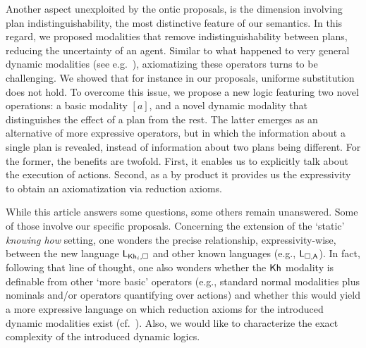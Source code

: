 Another aspect unexploited by the ontic proposals, is the dimension involving plan indistinguishability, the most distinctive feature of our semantics. In this regard, we proposed modalities that remove indistinguishability between plans, reducing the uncertainty of an agent. Similar to what happened to very general dynamic modalities (see e.g.~\cite{ArecesFH15}), axiomatizing these operators turns to be challenging. We showed that for instance in our proposals, uniforme substitution does not hold. To overcome this issue, we propose a new logic featuring two novel operations: a basic modality $[a]$, and a novel dynamic modality that distinguishes the effect of a plan from the rest. The latter emerges as an alternative of more expressive operators, but in which the information about a single plan is revealed, instead of information about two plans being different. For the former, the benefits are twofold. First, it enables us to explicitly talk about the execution of actions. Second, as a by product it provides us the expressivity to obtain an axiomatization via reduction axioms.

\begin{comment}
To the best of our knowledge, this is the first attempt to establish a theory of dynamic epistemic logics for knowing how. We argue that the semantics provided in~\cite{AFSVQ21,AFSVQ23report} is the crucial aspect for succeeding in this goal. Moreover, our work opens the path to study other dynamic operators in this context. For instance, we could define dynamic modalities based on action models, like those in~\cite{BaltagMS98,DELbook,GalimullinA22}. 
Also, it would be interesting to explore alternative techniques for obtaining proof systems without a general rule of substitution, for instance, by building a dynamic logic over a hybrid logic semantics (see e.g.~\cite{BenthemMZ2022}). Finally, we would like to characterize the exact complexity of the dynamic logics we introduced.
\end{comment}


While this article answers some questions, some others remain unanswered. 
Some of those involve our specific proposals. 
Concerning the extension of the `static' \emph{knowing how} setting, one wonders the precise relationship, expressivity-wise, between the new language $\mathsf{L}_{{\sf Kh}_i,\square}$ and other known languages (e.g., $\mathsf{L}_{\square,{\sf A}}$). In fact, following that line of thought, one also wonders whether the ${\sf Kh}$ modality is definable from other `more basic' operators (e.g., standard normal modalities plus nominals and/or operators quantifying over actions) and whether this would yield a more expressive language on which reduction axioms for the introduced dynamic modalities exist (cf.~\cite{BenthemMZ2022}). Also, we would like to characterize the exact complexity of the introduced dynamic logics.

